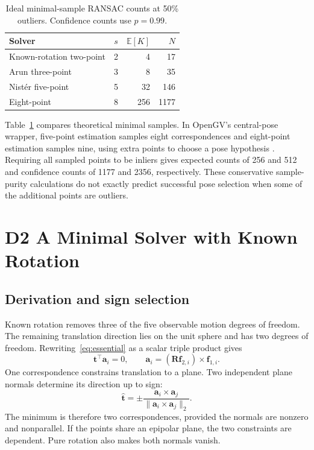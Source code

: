 \documentclass[10pt,a4paper,twocolumn]{article}
\newcommand{\R}{\mathbf R}
\newcommand{\ttt}{\mathbf t}
\newcommand{\ff}{\mathbf f}
\newcommand{\avec}{\mathbf a}
\begin{document}
\begin{table}[t]
\centering\small
\caption{Ideal minimal-sample RANSAC counts at 50\% outliers. Confidence counts use $p=0.99$.}
\label{tab:iterations}
\begin{tabular}{lrrr}\toprule
Solver & $s$ & $\mathbb E[K]$ & $N$\\\midrule
Known-rotation two-point & 2 & 4 & 17\\
Arun three-point & 3 & 8 & 35\\
Nist\'er five-point & 5 & 32 & 146\\
Eight-point & 8 & 256 & 1177\\\bottomrule
\end{tabular}
\end{table}

Table~\ref{tab:iterations} compares theoretical minimal samples. In OpenGV's central-pose wrapper, five-point estimation samples eight correspondences and eight-point estimation samples nine, using extra points to choose a pose hypothesis \cite{opengvsource}. Requiring all sampled points to be inliers gives expected counts of 256 and 512 and confidence counts of 1177 and 2356, respectively. These conservative sample-purity calculations do not exactly predict successful pose selection when some of the additional points are outliers.

\section{D2 A Minimal Solver with Known Rotation}
\subsection{Derivation and sign selection}
Known rotation removes three of the five observable motion degrees of freedom. The remaining translation direction lies on the unit sphere and has two degrees of freedom. Rewriting~\eqref{eq:essential} as a scalar triple product gives
\begin{equation}
 \ttt^\top\avec_i=0,\qquad
 \avec_i=(\R\ff_{2,i})\times\ff_{1,i}.
 \label{eq:twopoint}
\end{equation}
One correspondence constrains translation to a plane. Two independent plane normals determine its direction up to sign:
\begin{equation}
 \widehat{\ttt}=\pm\frac{\avec_i\times\avec_j}{\|\avec_i\times\avec_j\|_2}.
 \label{eq:cross}
\end{equation}
The minimum is therefore two correspondences, provided the normals are nonzero and nonparallel. If the points share an epipolar plane, the two constraints are dependent. Pure rotation also makes both normals vanish.
\end{document}

